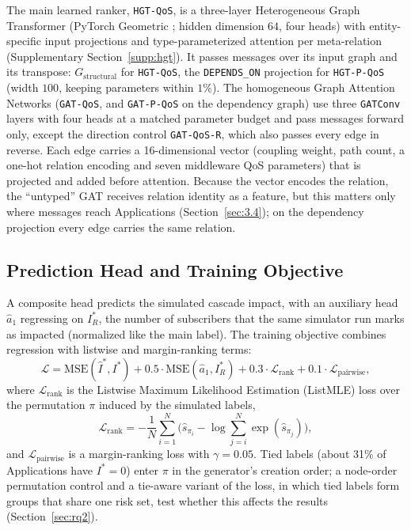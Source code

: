 The main learned ranker, \texttt{HGT-QoS}, is a three-layer Heterogeneous Graph Transformer \cite{hu2020hgt} (PyTorch Geometric \cite{fey2019fast}; hidden dimension $64$, four heads) with entity-specific input projections and type-parameterized attention per meta-relation (Supplementary Section~\ref{supp:hgt}). It passes messages over its input graph and its transpose: $G_{\text{structural}}$ for \texttt{HGT-QoS}, the \texttt{DEPENDS\_ON} projection for \texttt{HGT-P-QoS} (width $100$, keeping parameters within $1\%$). The homogeneous Graph Attention Networks (\texttt{GAT-QoS}, and \texttt{GAT-P-QoS} on the dependency graph) use three \texttt{GATConv} layers with four heads at a matched parameter budget and pass messages forward only, except the direction control \texttt{GAT-QoS-R}, which also passes every edge in reverse. Each edge carries a 16-dimensional vector (coupling weight, path count, a one-hot relation encoding and seven middleware QoS parameters) that is projected and added before attention. Because the vector encodes the relation, the ``untyped'' GAT receives relation identity as a feature, but this matters only where messages reach Applications (Section~\ref{sec:3.4}); on the dependency projection every edge carries the same relation.

\subsection{Prediction Head and Training Objective}
\label{sec:4.2}

A composite head predicts the simulated cascade impact, with an auxiliary head $\hat{a}_1$ regressing on $I^*_R$, the number of subscribers that the same simulator run marks as impacted (normalized like the main label). The training objective combines regression with listwise and margin-ranking terms:
\begin{equation}
\label{eq:loss_active}
\mathcal{L} = \text{MSE}(\hat{I}^*, I^*) + 0.5 \cdot \text{MSE}(\hat{a}_1, I^*_R) + 0.3 \cdot \mathcal{L}_{\text{rank}} + 0.1 \cdot \mathcal{L}_{\text{pairwise}},
\end{equation}
where $\mathcal{L}_{\text{rank}}$ is the Listwise Maximum Likelihood Estimation (ListMLE) loss \cite{xia2008listwise} over the permutation $\pi$ induced by the simulated labels,
\begin{equation}
\label{eq:listmle}
\mathcal{L}_{\text{rank}} = -\frac{1}{N}\sum_{i=1}^N \Big( \hat{s}_{\pi_i} - \log \sum_{j=i}^N \exp(\hat{s}_{\pi_j}) \Big),
\end{equation}
and $\mathcal{L}_{\text{pairwise}}$ is a margin-ranking loss with $\gamma = 0.05$. Tied labels (about 31\% of Applications have $I^* = 0$) enter $\pi$ in the generator's creation order; a node-order permutation control and a tie-aware variant of the loss, in which tied labels form groups that share one risk set, test whether this affects the results (Section~\ref{sec:rq2}).

